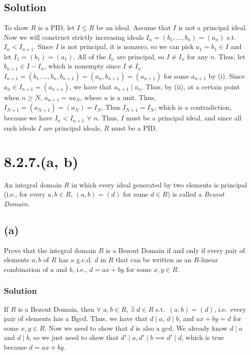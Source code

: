 \documentclass[fleqn]{article}
\begin{document}
        \subsection{Solution}
        To show $R$ is a PID, let $I \leq R$ be an ideal.  Assume that $I$ is not a principal ideal.  Now we will construct strictly increasing ideals $I_n = (b_1, ..., b_n) = (a_n)$ s.t.\ $I_n < I_{n + 1}$.  Since $I$ is not principal, it is nonzero, so we can pick $a_1 = b_1 \in I$ and let $I_1 = (b_1) = (a_1)$.  All of the $I_n$ are principal, so $I \neq I_n$ for any $n$.  Thus, let $b_{n + 1} \in I - I_n$, which is nonempty since $I \neq I_n$.  $I_{n + 1} = (b_1, ..., b_n, b_{n + 1}) = (a_n, b_{n + 1}) = (a_{n + 1})$ for some $a_{n + 1}$ by (i).  Since $a_n \in I_{n + 1} = (a_{n + 1})$, we have that $a_{n + 1} \mid a_n$.  Thus, by (ii), at a certain point when $n \geq N$, $a_{n + 1} = u a_N$, where $u$ is a unit.  Thus, $I_{N + 1} = (a_{N + 1}) = (a_N) = I_N$.  Thus $I_{N + 1} = I_N$, which is a contradiction, because we have $I_n < I_{n + 1}$ $\forall$ $n$.  Thus, $I$ must be a principal ideal, and since all such ideals $I$ are principal ideals, $R$ must be a PID.
    
    \section{8.2.7.(a, b)}
    An integral domain $R$ in which every ideal generated by two elements is principal (i.e., for every $a, b \in R$, $(a, b) = (d)$ for some $d \in R$) is called a \textit{Bezout Domain}.
        
        \subsection{(a)}
        Prove that the integral domain $R$ is a Bezout Domain if and only if every pair of elements $a, b$ of $R$ has a g.c.d. $d$ in $R$ that can be written as an $R$-linear combination of $a$ and $b$, i.e., $d = ax + by$ for some $x, y \in R$.
            
            \subsubsection{Solution}
            If $R$ is a Bezout Domain, then $\forall$ $a, b \in R$, $\exists$ $d \in R$ s.t.\ $(a, b) = (d)$, i.e.\ every pair of elements has a Bgcd.  Thus, we have that $d \mid a$, $d \mid b$, and $ax + by = d$ for some $x, y \in R$.  Now we need to show that $d$ is also a gcd.  We already know $d \mid a$ and $d \mid b$, so we just need to show that $d' \mid a, d' \mid b \implies d' \mid d$, which is true because $d = ax + by$.
            
\end{document}
